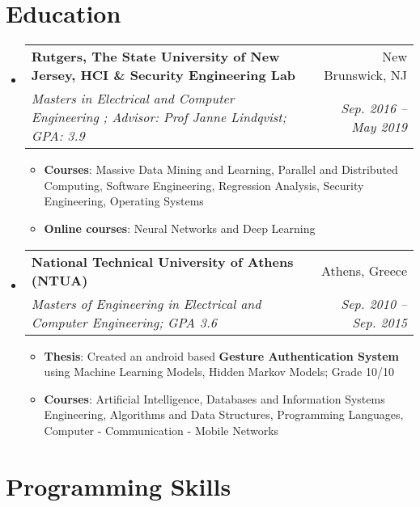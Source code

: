 \documentclass[letterpaper,10pt]{article}
\makeatletter
\newcommand{\resumeItem}[2]{
  \item\small{
    \textbf{#1}{: #2 \vspace{-2pt}}
  }
}
\newcommand{\resumeSubheading}[4]{
  \vspace{-1pt}\item
    \begin{tabular*}{0.97\textwidth}{l@{\extracolsep{\fill}}r}
      \textbf{#1} & #2 \\
      \textit{\small#3} & \textit{\small #4} \\
    \end{tabular*}\vspace{-5pt}
}
\newcommand{\resumeSubHeadingListStart}{\begin{itemize}[leftmargin=*]}
\newcommand{\resumeSubHeadingListEnd}{\end{itemize}}
\newcommand{\resumeItemListStart}{\begin{itemize}}
\newcommand{\resumeItemListEnd}{\end{itemize}\vspace{-5pt}}
\makeatother
\begin{document}
\section{Education}
\resumeSubHeadingListStart
\resumeSubheading
{Rutgers, The State University of New Jersey, HCI \& Security Engineering Lab }{New Brunswick, NJ}
{Masters in Electrical and Computer Engineering ; Advisor: Prof Janne Lindqvist; GPA: 3.9}{Sep. 2016 -- May 2019}
\resumeItemListStart
\resumeItem{Courses}{Massive Data Mining and Learning, Parallel and Distributed Computing, Software Engineering, Regression Analysis, Security Engineering, Operating Systems}
\resumeItem{Online courses}{Neural Networks and Deep Learning}
\resumeItemListEnd
\resumeSubheading
{National Technical University of Athens (NTUA)}{Athens, Greece}
{Masters of Engineering in Electrical and Computer Engineering;  GPA 3.6}{Sep. 2010 -- Sep. 2015}
\resumeItemListStart
\resumeItem{Thesis}{Created an android based \textbf{Gesture Authentication System} using Machine Learning Models, Hidden Markov Models; Grade                10/10}
\resumeItem{Courses}{Artificial Intelligence, Databases and Information Systems Engineering, Algorithms and Data Structures, Programming Languages, Computer  - Communication - Mobile Networks}
\resumeItemListEnd
\resumeSubHeadingListEnd




\section{Programming Skills}
\end{document}
